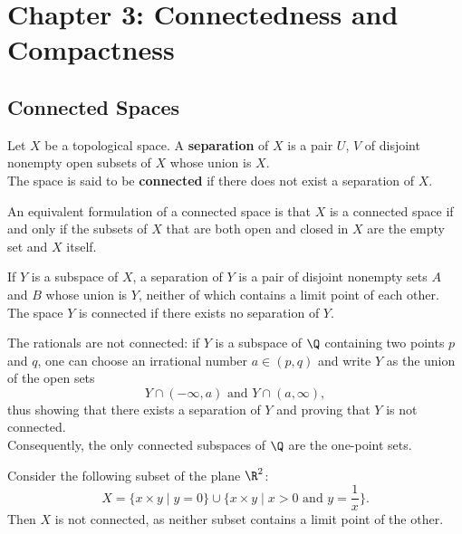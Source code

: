 \newpage

\section{Chapter 3: Connectedness and Compactness}
\setcounter{subsection}{22}

\subsection{Connected Spaces}

\begin{definition}
Let $X$ be a topological space. A \textbf{separation} of $X$ is a pair $U$, $V$ of disjoint nonempty open subsets of $X$
whose union is $X$. \\

The space is said to be \textbf{connected} if there does not exist a separation of $X$.
\end{definition}

\begin{remark}
An equivalent formulation of a connected space is that $X$ is a connected space if and only if the subsets of $X$
that are both open and closed in $X$ are the empty set and $X$ itself.
\end{remark}

\begin{lemma}
If $Y$ is a subspace of $X$, a separation of $Y$ is a pair of disjoint nonempty sets $A$ and $B$ whose union is $Y$, neither of which
contains a limit point of each other. The space $Y$ is connected if there exists no separation of $Y$.
\end{lemma}

\begin{eg}
The rationals are not connected: if $Y$ is a subspace of $\Q$ containing two points $p$ and $q$, one can choose
an irrational number $a \in (p, q)$ and write $Y$ as the union of the open sets 
\[
    Y \cap (-\infty, a) \text{ and } Y \cap (a, \infty),
\]
thus showing that there exists a separation of $Y$ and proving that $Y$ is not connected. \\

Consequently, the only connected subspaces of $\Q$ are the one-point sets.
\end{eg}

\begin{eg}
Consider the following subset of the plane $\R^2$:
\[
    X = \{ x \times y \mid y = 0 \} \cup \{ x \times y \mid x > 0 \text{ and } y = \frac{1}{x} \}. 
\]
Then $X$ is not connected, as neither subset contains a limit point of the other.
\end{eg}

